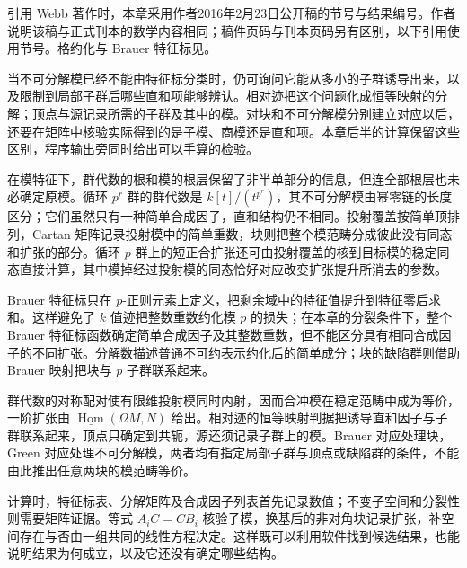 \ProseParagraphBreak
引用 Webb 著作时，本章采用作者2016年2月23日公开稿的节号与结果编号。作者说明该稿与正式刊本的数学内容相同；稿件页码与刊本页码另有区别，以下引用使用节号。格约化与 Brauer 特征标见\cite[Sections 9.4, 10.1; Section 12.5]{Webb2016FiniteGroupRepresentations}。

\ProseParagraphBreak
当不可分解模已经不能由特征标分类时，仍可询问它能从多小的子群诱导出来，以及限制到局部子群后哪些直和项能够辨认。相对迹把这个问题化成恒等映射的分解；顶点与源记录所需的子群及其中的模。对块和不可分解模分别建立对应以后，还要在矩阵中核验实际得到的是子模、商模还是直和项。本章后半的计算保留这些区别，程序输出旁同时给出可以手算的检验。









\begin{chaptersummary}
	在模特征下，群代数的根和模的根层保留了非半单部分的信息，但连全部根层也未必确定原模。循环 \(p^r\) 群的群代数是 \(k[t]/(t^{p^r})\)，其不可分解模由幂零链的长度区分；它们虽然只有一种简单合成因子，直和结构仍不相同。投射覆盖按简单顶排列，Cartan 矩阵记录投射模中的简单重数，块则把整个模范畴分成彼此没有同态和扩张的部分。循环 \(p\) 群上的短正合扩张还可由投射覆盖的核到目标模的稳定同态直接计算，其中模掉经过投射模的同态恰好对应改变扩张提升所消去的参数。

	\ProseParagraphBreak

	Brauer 特征标只在 \(p\)-正则元素上定义，把剩余域中的特征值提升到特征零后求和。这样避免了 \(k\) 值迹把整数重数约化模 \(p\) 的损失；在本章的分裂条件下，整个 Brauer 特征标函数确定简单合成因子及其整数重数，但不能区分具有相同合成因子的不同扩张。分解数描述普通不可约表示约化后的简单成分；块的缺陷群则借助 Brauer 映射把块与 \(p\) 子群联系起来。

	\ProseParagraphBreak
	群代数的对称配对使有限维投射模同时内射，因而合冲模在稳定范畴中成为等价，一阶扩张由 \(\underline{\operatorname{Hom}}(\Omega M,N)\) 给出。相对迹的恒等映射判据把诱导直和因子与子群联系起来，顶点只确定到共轭，源还须记录子群上的模。Brauer 对应处理块，Green 对应处理不可分解模，两者均有指定局部子群与顶点或缺陷群的条件，不能由此推出任意两块的模范畴等价。

	\ProseParagraphBreak
	计算时，特征标表、分解矩阵及合成因子列表首先记录数值；不变子空间和分裂性则需要矩阵证据。等式 \(A_iC=CB_i\) 核验子模，换基后的非对角块记录扩张，补空间存在与否由一组共同的线性方程决定。这样既可以利用软件找到候选结果，也能说明结果为何成立，以及它还没有确定哪些结构。
\end{chaptersummary}

